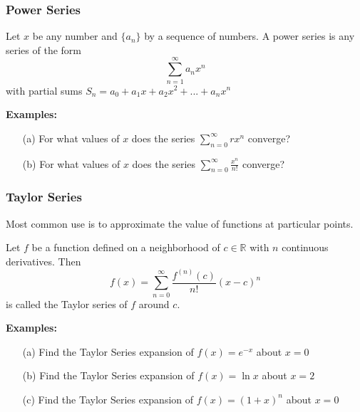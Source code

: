 \documentclass{beamer}
\begin{document}
\begin{frame}
\frametitle{Power Series}
Let $x$ be any number and $\{a_n\}$ by a sequence of numbers. A power series is any series of the form 
$$\sum_{n=1}^\infty a_n x^n$$
with partial sums $S_n = a_0 + a_1x + a_2x^2 + ... + a_nx^n$

\vspace{12pt}
\textbf{Examples:}
\begin{itemize}
	\item[(a)] For what values of $x$ does the series $\sum_{n=0}^\infty rx^n$ converge?
	\item[(b)] For what values of $x$ does the series $\sum_{n=0}^\infty \frac{x^n}{n!}$ converge?
\end{itemize}
\end{frame}

\begin{frame}
\frametitle{Taylor Series}
Most common use is to approximate the value of functions at particular points.
\begin{theorem}
	Let $f$ be a function defined on a neighborhood of $c \in \mathbb{R}$ with $n$ continuous derivatives. Then
	$$f(x) = \sum_{n=0}^{\infty} \frac{f^{(n)}(c)}{n!} (x-c)^n$$
	is called the Taylor series of $f$ around $c$.
\end{theorem}

\vspace{6pt}
\textbf{Examples:}
\begin{itemize}
	\item[(a)] Find the Taylor Series expansion of $f(x) = e^{-x}$ about $x=0$
	\item[(b)] Find the Taylor Series expansion of $f(x) = \ln x$ about $x=2$
	\item[(c)] Find the Taylor Series expansion of $f(x) = (1+x)^n$ about $x=0$
\end{itemize}
\end{frame}
\end{document}
